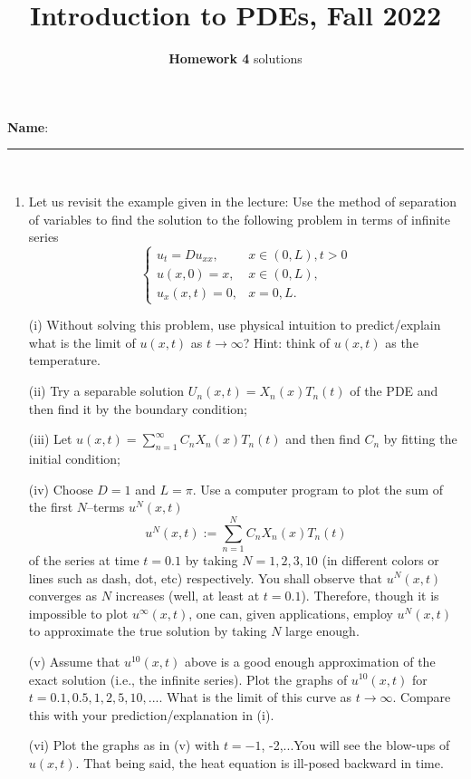 \documentclass[6pt]{article}
\title{Introduction to PDEs, Fall 2022}
\author{\textbf{Homework 4} solutions}
\date{}
\numberwithin{equation}{section}
\begin{document}
\maketitle

\textbf{Name}:\rule{1 in}{0.001 in} \\
\begin{enumerate}

\item  Let us revisit the example given in the lecture: Use the method of separation of variables to find the solution to the following problem in terms of infinite series
\begin{equation}
\left\{
\begin{array}{ll}
u_t=Du_{xx},& x\in (0,L), t>0\\
u(x,0)=x, &x\in(0,L), \\
u_x(x,t)=0, & x=0,L.
\end{array}
\right.
\end{equation}

(i) Without solving this problem, use physical intuition to predict/explain what is the limit of $u(x,t)$ as $t\rightarrow \infty$?  Hint: think of $u(x,t)$ as the temperature.

(ii)  Try a separable solution $U_n(x,t)=X_n(x)T_n(t)$ of the PDE and then find it by the boundary condition;

(iii)  Let $u(x,t)=\sum^\infty_{n=1}C_nX_n(x)T_n(t)$ and then find $C_n$ by fitting the initial condition;

(iv)  Choose $D=1$ and $L=\pi$.  Use a computer program to plot the sum of the first $N$--terms $u^N(x,t)$
\[u^N(x,t):=\sum^N_{n=1}C_nX_n(x)T_n(t)\]
of the series at time $t=0.1$ by taking $N=1, 2, 3, 10$ (in different colors or lines such as dash, dot, etc) respectively.  You shall observe that $u^N(x,t)$ converges as $N$ increases (well, at least at $t=0.1$).  Therefore, though it is impossible to plot $u^\infty(x,t)$, one can, given applications, employ $u^N(x,t)$ to approximate the true solution by taking $N$ large enough.

(v)  Assume that $u^{10}(x,t)$ above is a good enough approximation of the exact solution (i.e., the infinite series).  Plot the graphs of $u^{10}(x,t)$ for $t=0.1,0.5,1,2,5,10,...$. What is the limit of this curve as $t\rightarrow \infty$.  Compare this with your prediction/explanation in (i).

(vi) Plot the graphs as in (v) with $t=-1$, -2,...You will see the blow-ups of $u(x,t)$.   That being said, the heat equation is ill-posed backward in time.


\end{enumerate}
\end{document}
